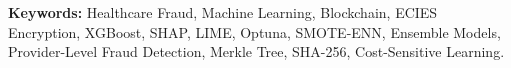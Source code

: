 \documentclass[12pt,a4paper,oneside]{report}
\begin{document}
\noindent\textbf{Keywords:} Healthcare Fraud, Machine Learning, Blockchain, ECIES Encryption, XGBoost, SHAP, LIME, Optuna, SMOTE-ENN, Ensemble Models, Provider-Level Fraud Detection, Merkle Tree, SHA-256, Cost-Sensitive Learning.

\newpage
\tableofcontents

\newpage
\listoffigures

\newpage
\listoftables

\newpage
{}






\end{document}
